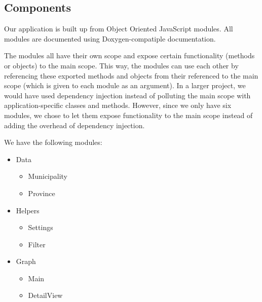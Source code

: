 	\subsection{Components}
		Our application is built up from Object Oriented JavaScript modules.
		All modules are documented using Doxygen-compatiple documentation.

		The modules all have their own scope and expose certain functionality (methods or objects) to the main scope.
		This way, the modules can use each other by referencing these exported methods and objects from their referenced to the main scope (which is given to each module as an argument).
		In a larger project, we would have used dependency injection instead of polluting the main scope with application-specific classes and methods.
		However, since we only have six modules, we chose to let them expose functionality to the main scope instead of adding the overhead of dependency injection.

		We have the following modules:

		\begin{itemize}
			\item Data
				\begin{itemize}
					\item Municipality
					\item Province
				\end{itemize}
			\item Helpers
				\begin{itemize}
					\item Settings
					\item Filter
				\end{itemize}
			\item Graph
				\begin{itemize}
					\item Main
					\item DetailView
				\end{itemize}
		\end{itemize}

		

